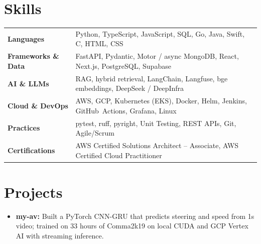 \documentclass[11pt, letterpaper]{article}
\begin{document}
\section{Skills}
\begin{tabularx}{\textwidth}{@{}l @{\hspace{7pt}} >{\raggedright\arraybackslash}X@{}}
  \textbf{Languages} & Python, TypeScript, JavaScript, SQL, Go, Java, Swift, C, HTML, CSS \\[1pt]
  \textbf{Frameworks \& Data} & FastAPI, Pydantic, Motor / async MongoDB, React, Next.js, PostgreSQL, Supabase \\[1pt]
  \textbf{AI \& LLMs} & RAG, hybrid retrieval, LangChain, Langfuse, bge embeddings, DeepSeek / DeepInfra \\[1pt]
  \textbf{Cloud \& DevOps} & AWS, GCP, Kubernetes (EKS), Docker, Helm, Jenkins, GitHub~Actions, Grafana, Linux \\[1pt]
  \textbf{Practices} & pytest, ruff, pyright, Unit Testing, REST APIs, Git, Agile/Scrum \\[1pt]
  \textbf{Certifications} & AWS Certified Solutions Architect -- Associate, AWS Certified Cloud Practitioner \\
\end{tabularx}

\section{Projects}
\begin{itemize}
  \item \textbf{my-av:} Built a PyTorch CNN-GRU that predicts steering and speed from 1s video; trained on 33 hours of Comma2k19 on local CUDA and GCP Vertex AI with streaming inference.
\end{itemize}
\end{document}
